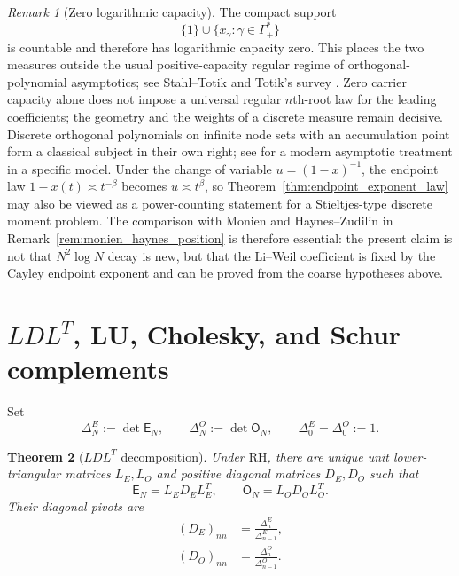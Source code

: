 \documentclass[11pt]{amsart}
\numberwithin{equation}{section}
\theoremstyle{plain}
\newtheorem{theorem}{Theorem}[section]
\theoremstyle{definition}
\theoremstyle{remark}
\newtheorem{remark}[theorem]{Remark}
\newcommand{\RH}{\mathrm{RH}}
\newcommand{\E}{\mathsf E}
\newcommand{\Omat}{\mathsf O}
\begin{document}
\begin{remark}[Zero logarithmic capacity]
\label{rem:zero_capacity_support}
The compact support
\begin{equation}
\{1\}\cup\{x_\gamma:\gamma\in\Gamma_+^*\}
\label{eq:polar_support}
\end{equation}
is countable and therefore has logarithmic capacity zero. This places the two measures outside the usual positive-capacity regular regime of orthogonal-polynomial asymptotics; see Stahl--Totik \cite{StahlTotik1992} and Totik's survey \cite{Totik2005Orthogonal}. Zero carrier capacity alone does not impose a universal regular $n$th-root law for the leading coefficients; the geometry and the weights of a discrete measure remain decisive. Discrete orthogonal polynomials on infinite node sets with an accumulation point form a classical subject in their own right; see \cite{WuLinXuZhao2016} for a modern asymptotic treatment in a specific model. Under the change of variable $u=(1-x)^{-1}$, the endpoint law $1-x(t)\asymp t^{-\beta}$ becomes $u\asymp t^{\beta}$, so Theorem~\ref{thm:endpoint_exponent_law} may also be viewed as a power-counting statement for a Stieltjes-type discrete moment problem. The comparison with Monien and Haynes--Zudilin in Remark~\ref{rem:monien_haynes_position} is therefore essential: the present claim is not that $N^2\log N$ decay is new, but that the Li--Weil coefficient is fixed by the Cayley endpoint exponent and can be proved from the coarse hypotheses above.
\end{remark}

\section{\texorpdfstring{$LDL^T$}{LDL\textasciicircum T}, LU, Cholesky, and Schur complements}
\label{sec:factorizations}

Set
\begin{equation}
\Delta_N^E:=\det\E_N,
\qquad
\Delta_N^O:=\det\Omat_N,
\qquad
\Delta_0^E=\Delta_0^O:=1.
\label{eq:delta_definitions}
\end{equation}

\begin{theorem}[$LDL^T$ decomposition]
\label{thm:LDL}
Under $\RH$, there are unique unit lower-triangular matrices $L_E,L_O$ and positive diagonal matrices $D_E,D_O$ such that
\begin{equation}
\E_N=L_E D_E L_E^T,
\qquad
\Omat_N=L_O D_O L_O^T.
\label{eq:LDL_decompositions}
\end{equation}
Their diagonal pivots are
\begin{align}
(D_E)_{nn}&=\frac{\Delta_n^E}{\Delta_{n-1}^E},
\label{eq:E_LDL_pivots}\\
(D_O)_{nn}&=\frac{\Delta_n^O}{\Delta_{n-1}^O}.
\label{eq:O_LDL_pivots}
\end{align}
\end{theorem}
\end{document}
